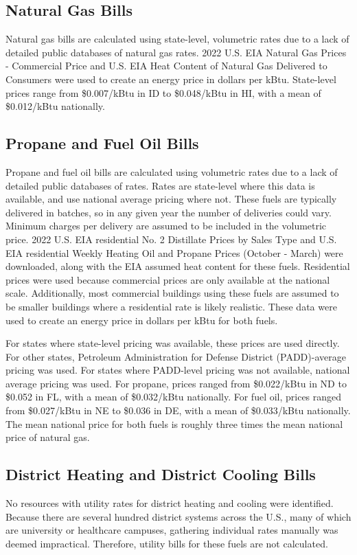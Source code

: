 \subsection{Natural Gas Bills}
Natural gas bills are calculated using state-level, volumetric rates due to a lack of detailed public databases of natural gas rates. 2022 U.S. EIA Natural Gas Prices - Commercial Price and U.S. EIA Heat Content of Natural Gas Delivered to Consumers \citep{eia_natural_gas} were used to create an energy price in dollars per kBtu. State-level prices range from \$0.007/kBtu in ID to \$0.048/kBtu in HI, with a mean of \$0.012/kBtu nationally.

\subsection{Propane and Fuel Oil Bills}
Propane and fuel oil bills are calculated using volumetric rates due to a lack of detailed public databases of rates. Rates are state-level where this data is available, and use national average pricing where not. These fuels are typically delivered in batches, so in any given year the number of deliveries could vary. Minimum charges per delivery are assumed to be included in the volumetric price. 2022 U.S. EIA residential No. 2 Distillate Prices by Sales Type and U.S. EIA residential Weekly Heating Oil and Propane Prices (October - March) \citep{eia_fuel_oil_and_propane} were downloaded, along with the EIA assumed heat content for these fuels. Residential prices were used because commercial prices are only available at the national scale. Additionally, most commercial buildings using these fuels are assumed to be smaller buildings where a residential rate is likely realistic. These data were used to create an energy price in dollars per kBtu for both fuels.

For states where state-level pricing was available, these prices are used directly. For other states, Petroleum Administration for Defense District (PADD)-average pricing was used. For states where PADD-level pricing was not available, national average pricing was used. For propane, prices ranged from \$0.022/kBtu in ND to \$0.052 in FL, with a mean of \$0.032/kBtu nationally. For fuel oil, prices ranged from \$0.027/kBtu in NE to \$0.036 in DE, with a mean of \$0.033/kBtu nationally. The mean national price for both fuels is roughly three times the mean national price of natural gas.

\subsection{District Heating and District Cooling Bills}
No resources with utility rates for district heating and cooling were identified. Because there are several hundred district systems across the U.S., many of which are university or healthcare campuses, gathering individual rates manually was deemed impractical. Therefore, utility bills for these fuels are not calculated.
